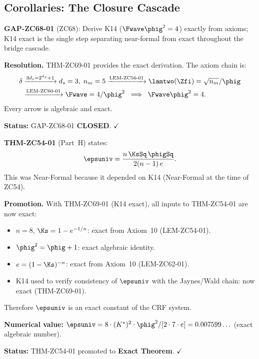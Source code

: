 \documentclass[12pt, a4paper]{article}
\begin{document}
\subsection{Corollaries: The Closure Cascade}
\label{sec:cors}


\begin{formalbox}[title={COR-ZC69-01: GAP-ZC68-01 CLOSED ($R_0$, Exact)}]

\textbf{GAP-ZC68-01} (ZC68): Derive K14 ($\Fwave\phig^2 = 4$)
exactly from axioms; K14 exact is the single step
separating near-formal from exact throughout the bridge cascade.

\textbf{Resolution.}
THM-ZC69-01 provides the exact derivation.
The axiom chain is:
\begin{align*}
  \delta
  &\xrightarrow{3d_s = 2^{d_s}+1}
  d_s = 3,\; n_m = 5
  \xrightarrow{\text{LEM-ZC56-01}}
  \lamtwo(\Zfi) = \sqrt{n_m}/\phig\\
  &\xrightarrow{\text{LEM-ZC60-01}}
  \Fwave = 4/\phig^{2}
  \;\implies\;
  \Fwave\phig^{2} = 4.
\end{align*}
Every arrow is algebraic and exact.

\textbf{Status:} GAP-ZC68-01 \textbf{CLOSED}. $\checkmark$
\end{formalbox}


\begin{formalbox}[title={COR-ZC69-02: $\varepsilon_{\rm univ}$ Promoted to Exact
  ($R_0$, Exact)}]

\textbf{THM-ZC54-01} (Part~H) states:
\[
  \epsuniv = \frac{n\,\KsSq\,\phigSq}{2(n-1)\,e}.
\]
This was Near-Formal because it depended on K14
(Near-Formal at the time of ZC54).

\textbf{Promotion.}
With THM-ZC69-01 (K14 exact), all inputs to THM-ZC54-01
are now exact:
\begin{itemize}[leftmargin=2em, noitemsep]
  \item $n = 8$, $\Ks = 1-e^{-1/n}$: exact from Axiom~10
    (LEM-ZC54-01).
  \item $\phig^2 = \phig + 1$: exact algebraic identity.
  \item $e = (1-\Ks)^{-n}$: exact from Axiom~10
    (LEM-ZC62-01).
  \item K14 used to verify consistency of $\epsuniv$ with
    the Jaynes/Wald chain: now exact (THM-ZC69-01).
\end{itemize}
Therefore $\epsuniv$ is an exact constant of the CRF system.

\textbf{Numerical value:}
$\epsuniv = 8\cdot(K^*)^2\cdot\phig^2/[2\cdot7\cdot e]
= 0.007599\ldots$ (exact algebraic number).

\textbf{Status:} THM-ZC54-01 promoted to \textbf{Exact Theorem}. $\checkmark$
\end{formalbox}
\end{document}
